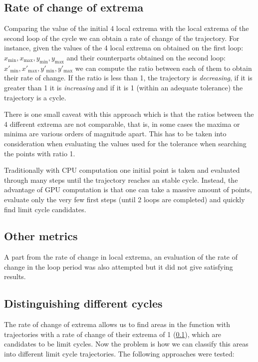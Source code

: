 \pagebreak

\subsection{Rate of change of extrema}%
\label{sub:roc}

Comparing the value of the initial 4 local extrema with the local extrema of the second loop of the cycle we can obtain a rate of change of the trajectory. For instance, given the values of the 4 local extrema on obtained on the first loop: $x_{\min}, x_{\max}, y_{\min}, y_{\max}$ and their counterparts obtained on the second loop: $x'_{\min}, x'_{\max}, y'_{\min}, y'_{\max}$ we can compute the ratio between each of them to obtain their rate of change. If the ratio is less than 1, the trajectory is \emph{decreasing}, if it is greater than 1 it is \emph{increasing} and if it is 1 (within an adequate tolerance) the trajectory is a cycle.

There is one small caveat with this approach which is that the ratios between the 4 different extrema are not comparable, that is, in some cases the maxima or minima are various orders of magnitude apart. This has to be taken into consideration when evaluating the values used for the tolerance when searching the points with ratio 1.

Traditionally with CPU computation one initial point is taken and evaluated through many steps until the trajectory reaches an stable cycle. Instead, the advantage of GPU computation is that one can take a massive amount of points, evaluate only the very few first steps (until 2 loops are completed) and quickly find limit cycle candidates.

\subsection{Other metrics}

A part from the rate of change in local extrema, an evaluation of the rate of
change in the loop period was also attempted but it did not give satisfying
results.

\subsection{Distinguishing different cycles}

The rate of change of extrema allows us to find areas in the function with
trajectories with a rate of change of their extrema of 1 (\cref{sub:roc}),
which are candidates to be limit cycles. Now the problem is how we can classify
this areas into different limit cycle trajectories. The following approaches
were tested:

